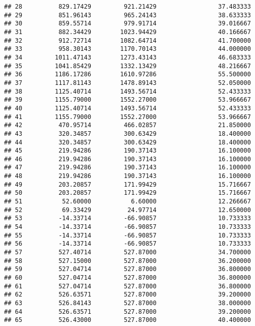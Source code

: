 \documentclass[]{article}
\begin{document}
\begin{verbatim}
## 28          829.17429         921.21429                 37.483333
## 29          851.96143         965.24143                 38.633333
## 30          859.55714         979.91714                 39.016667
## 31          882.34429        1023.94429                 40.166667
## 32          912.72714        1082.64714                 41.700000
## 33          958.30143        1170.70143                 44.000000
## 34         1011.47143        1273.43143                 46.683333
## 35         1041.85429        1332.13429                 48.216667
## 36         1186.17286        1610.97286                 55.500000
## 37         1117.81143        1478.89143                 52.050000
## 38         1125.40714        1493.56714                 52.433333
## 39         1155.79000        1552.27000                 53.966667
## 40         1125.40714        1493.56714                 52.433333
## 41         1155.79000        1552.27000                 53.966667
## 42          470.95714         466.02857                 21.850000
## 43          320.34857         300.63429                 18.400000
## 44          320.34857         300.63429                 18.400000
## 45          219.94286         190.37143                 16.100000
## 46          219.94286         190.37143                 16.100000
## 47          219.94286         190.37143                 16.100000
## 48          219.94286         190.37143                 16.100000
## 49          203.20857         171.99429                 15.716667
## 50          203.20857         171.99429                 15.716667
## 51           52.60000           6.60000                 12.266667
## 52           69.33429          24.97714                 12.650000
## 53          -14.33714         -66.90857                 10.733333
## 54          -14.33714         -66.90857                 10.733333
## 55          -14.33714         -66.90857                 10.733333
## 56          -14.33714         -66.90857                 10.733333
## 57          527.40714         527.87000                 34.700000
## 58          527.15000         527.87000                 36.200000
## 59          527.04714         527.87000                 36.800000
## 60          527.04714         527.87000                 36.800000
## 61          527.04714         527.87000                 36.800000
## 62          526.63571         527.87000                 39.200000
## 63          526.84143         527.87000                 38.000000
## 64          526.63571         527.87000                 39.200000
## 65          526.43000         527.87000                 40.400000

\end{verbatim}
\end{document}
